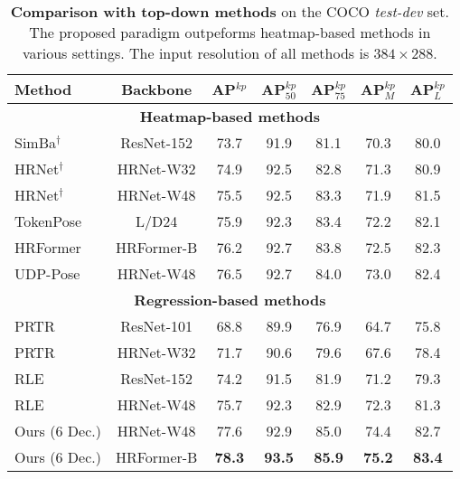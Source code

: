 \documentclass[runningheads]{llncs}
\begin{document}
\begin{table}[!t]
{\begin{tabular}{r |c|c|c|c|c|c|c|c}
	\end{tabular}}
\label{tab:comparisons_with_sota_on_val}
\end{table}


\begin{table}[!t]
    \begin{center}
    \caption{\textbf{Comparison with top-down methods} on the COCO \emph{test-dev} set. The proposed paradigm outpeforms heatmap-based methods in various settings.
The input resolution of all methods is $384\times288$.}
    \resizebox{0.65\linewidth}{!}
    {\begin{tabular}{l|c|c|c|c|c|c}
		\hline
	    Method & Backbone  & AP$^{kp}$ & AP$^{kp}_{50}$ & AP$^{kp}_{75}$ & AP$^{kp}_{M}$ & AP$^{kp}_{L}$ \\
	    \hline
	    \multicolumn{7}{c}{\textbf{Heatmap-based methods}} \\
	    \hline
SimBa$^\dag$~\cite{xiao2018simple}          & ResNet-152        & 73.7 & 91.9 & 81.1 & 70.3 & 80.0 \\ HRNet$^\dag$~\cite{sun2019deep}                 & HRNet-W32         & 74.9 & 92.5 & 82.8 & 71.3 & 80.9 \\ HRNet$^\dag$~\cite{sun2019deep}                 & HRNet-W48         & 75.5 & 92.5 & 83.3 & 71.9 & 81.5 \\ TokenPose~\cite{li2021tokenpose}                & L/D24             & 75.9 & 92.3 & 83.4 & 72.2 & 82.1 \\ HRFormer~\cite{yuan2021hrformer}              & HRFormer-B        & 76.2 & 92.7 & 83.8 & 72.5 & 82.3 \\ UDP-Pose~\cite{huang2020devil}                  & HRNet-W48         & 76.5 & 92.7 & 84.0 & 73.0 & 82.4 \\ \hline
        \multicolumn{7}{c}{\textbf{Regression-based methods}} \\
	    \hline
	    PRTR~\cite{li2021PRTR}                          & ResNet-101        & 68.8 & 89.9 & 76.9 & 64.7 & 75.8 \\ PRTR~\cite{li2021PRTR}                          & HRNet-W32         & 71.7 & 90.6 & 79.6 & 67.6 & 78.4 \\ RLE~\cite{li2021human}                          & ResNet-152        & 74.2 & 91.5 & 81.9 & 71.2 & 79.3 \\ RLE~\cite{li2021human}                          & HRNet-W48 & 75.7 & 92.3 & 82.9 & 72.3 & 81.3 \\ Ours (6 Dec.)                                  & HRNet-W48         & 77.6 & 92.9 & 85.0 & 74.4 & 82.7 \\
Ours (6 Dec.)                                 & HRFormer-B        & \textbf{78.3} & \textbf{93.5} & \textbf{85.9} & \textbf{75.2}  & \textbf{83.4} \\
    \hline
	\end{tabular}
    }
    \end{center}
\label{tab:comparisons_with_sota_on_coco_test}
\end{table}
\end{document}
